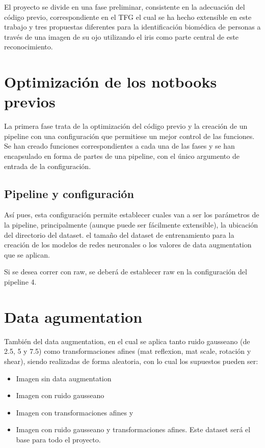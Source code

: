  \label{capitulo5}

El proyecto se divide en una fase preliminar, consistente en la adecuación del código previo, correspondiente en el TFG
el cual se ha hecho extensible en este trabajo y tres propuestas diferentes para la identificación biomédica de personas 
a través de una imagen de su ojo utilizando el iris como parte central de este reconocimiento.

\section{Optimización de los notbooks previos}

La primera fase trata de la optimización del código previo y la creación de un pipeline con una configuración que permitiese un mejor control de las funciones.
Se han creado funciones correspondientes a cada una de las fases y se han encapsulado en forma de partes de una pipeline, con el único argumento de entrada de la 
configuración. 


\subsection{Pipeline y configuración} 

Así pues, esta configuración permite establecer cuales van a ser los parámetros de la pipeline, principalmente (aunque puede ser fácilmente extensible),
 la ubicación del directorio del dataset. el tamaño del dataset de entrenamiento para la creación de los modelos de redes neuronales o los valores
 de data augmentation que se aplican.

 Si se desea correr con raw, se deberá de establecer raw en la configuración del pipeline 4.

\section{Data agumentation}

También del  data augmentation, en el cual se aplica tanto ruido gausseano (de 2.5, 5 y 7.5) como transformaciones afines (mat reflexion, mat scale, rotación y shear), siendo realizadas de 
forma aleatoria, con lo cual los supuestos pueden ser:

\begin{itemize}
    \item Imagen sin data augmentation
    \item Imagen con ruido gausseano
    \item Imagen con transformaciones afines y 
    \item Imagen con ruido gausseano y transformaciones afines. Este dataset será el base para todo el proyecto.
\end{itemize}


